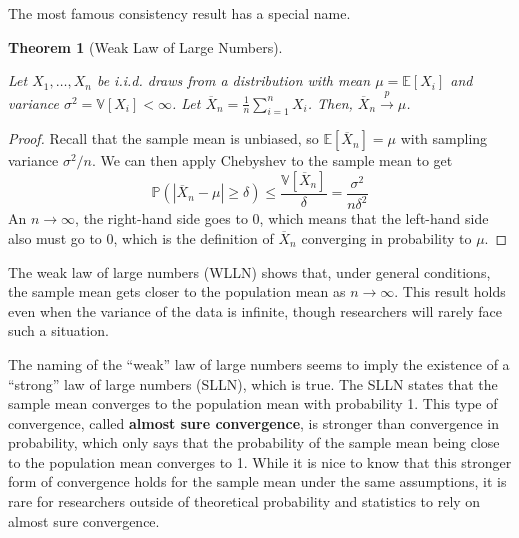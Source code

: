 \documentclass[
  13pt,
  letterpaper,
  DIV=11,
  numbers=noendperiod]{scrreprt}
\newcommand{\E}{\mathbb{E}}
\newcommand{\V}{\mathbb{V}}
\renewcommand{\P}{\mathbb{P}}
\newcommand{\Xbar}{\overline{X}}
\newcommand{\inprob}{\overset{p}{\to}}
\theoremstyle{plain}
\newtheorem{theorem}{Theorem}[chapter]
\theoremstyle{definition}
\theoremstyle{definition}
\theoremstyle{remark}
\begin{document}
The most famous consistency result has a special name.

\begin{theorem}[Weak Law of Large
Numbers]\protect\hypertarget{thm-lln}{}\label{thm-lln}

Let \(X_1, \ldots, X_n\) be i.i.d. draws from a distribution with mean
\(\mu = \E[X_i]\) and variance \(\sigma^2 = \V[X_i] < \infty\). Let
\(\Xbar_n = \frac{1}{n} \sum_{i =1}^n X_i\). Then,
\(\Xbar_n \inprob \mu\).

\end{theorem}

\begin{proof}
Recall that the sample mean is unbiased, so \(\E[\Xbar_n] = \mu\) with
sampling variance \(\sigma^2/n\). We can then apply Chebyshev to the
sample mean to get \[
\P(|\Xbar_n - \mu| \geq \delta) \leq \frac{\V[\Xbar_n]}{\delta} = \frac{\sigma^2}{n\delta^2}
\] An \(n\rightarrow\infty\), the right-hand side goes to 0, which means
that the left-hand side also must go to 0, which is the definition of
\(\Xbar_n\) converging in probability to \(\mu\).
\end{proof}

The weak law of large numbers (WLLN) shows that, under general
conditions, the sample mean gets closer to the population mean as
\(n\rightarrow\infty\). This result holds even when the variance of the
data is infinite, though researchers will rarely face such a situation.

\begin{tcolorbox}[enhanced jigsaw, title=\textcolor{quarto-callout-note-color}{\faInfo}\hspace{0.5em}{Note}, breakable, colbacktitle=quarto-callout-note-color!10!white, toptitle=1mm, colback=white, arc=.35mm, left=2mm, opacityback=0, titlerule=0mm, colframe=quarto-callout-note-color-frame, leftrule=.75mm, coltitle=black, opacitybacktitle=0.6, bottomtitle=1mm, rightrule=.15mm, bottomrule=.15mm, toprule=.15mm]

The naming of the ``weak'' law of large numbers seems to imply the
existence of a ``strong'' law of large numbers (SLLN), which is true.
The SLLN states that the sample mean converges to the population mean
with probability 1. This type of convergence, called \textbf{almost sure
convergence}, is stronger than convergence in probability, which only
says that the probability of the sample mean being close to the
population mean converges to 1. While it is nice to know that this
stronger form of convergence holds for the sample mean under the same
assumptions, it is rare for researchers outside of theoretical
probability and statistics to rely on almost sure convergence.

\end{tcolorbox}
\end{document}
